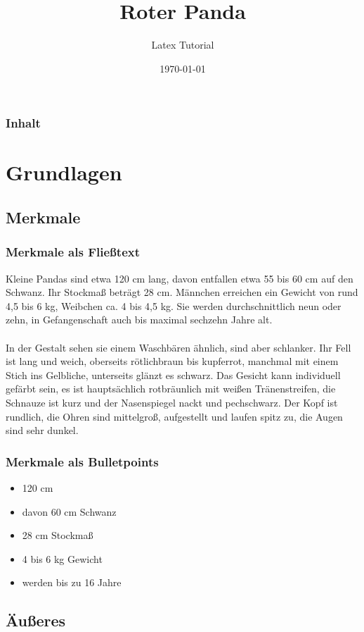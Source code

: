\documentclass{beamer}
\title[Ailurus fulgens]{Roter Panda}
\author{Latex Tutorial}
\institute[LT]{Universität von LatexTutorial}
\date{\today}
\begin{document}
\begin{frame}
	\titlepage
\end{frame}

\begin{frame}
	\frametitle{Inhalt}
	\tableofcontents
\end{frame}

\section{Grundlagen}
\subsection{Merkmale}

\begin{frame}
	\frametitle{Merkmale als Fließtext}
	Kleine Pandas sind etwa 120 cm lang, davon entfallen etwa 55 bis 60 cm auf den Schwanz. Ihr Stockmaß beträgt 28 cm. Männchen erreichen ein Gewicht von rund 4,5 bis 6 kg, Weibchen ca. 4 bis 4,5 kg. Sie werden durchschnittlich neun oder zehn, in Gefangenschaft auch bis maximal sechzehn Jahre alt.\\~\\
	In der Gestalt sehen sie einem Waschbären ähnlich, sind aber schlanker. Ihr Fell ist lang und weich, oberseits rötlichbraun bis kupferrot, manchmal mit einem Stich ins Gelbliche, unterseits glänzt es schwarz. Das Gesicht kann individuell gefärbt sein, es ist hauptsächlich rotbräunlich mit weißen Tränenstreifen, die Schnauze ist kurz und der Nasenspiegel nackt und pechschwarz. Der Kopf ist rundlich, die Ohren sind mittelgroß, aufgestellt und laufen spitz zu, die Augen sind sehr dunkel.
\end{frame}

\begin{frame}
	\frametitle{Merkmale als Bulletpoints}
	\begin{itemize}
		\item 120 cm \pause
		\item davon 60 cm Schwanz \pause
		\item 28 cm Stockmaß \pause
		\item 4 bis 6 kg Gewicht \pause
		\item werden bis zu 16 Jahre 
	\end{itemize}
\end{frame}


\subsection{Äußeres}
\end{document}
